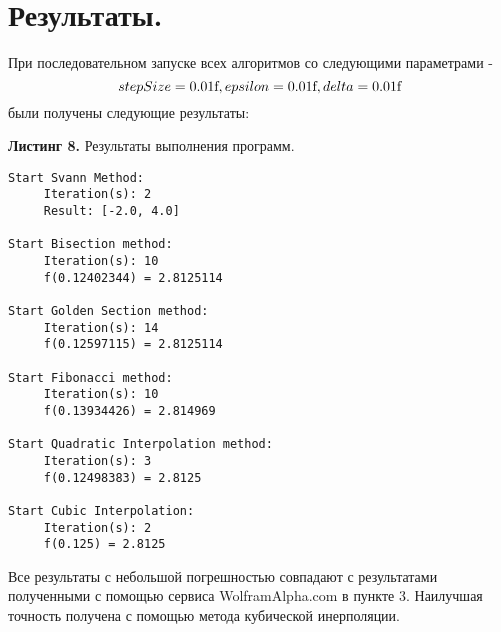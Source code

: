 \documentclass[a4paper, 12pt]{article}   	%
\begin{document}
\newpage

\section{Результаты.}
    При последовательном запуске всех алгоритмов со следующими параметрами -
    \begin{equation}
        stepSize = 0.01{\text f}, epsilon = 0.01{\text f}, delta = 0.01{\text f}
    \end{equation}
    были получены следующие результаты:
    
    \textbf{Листинг 8.} Результаты выполнения программ.
    \begin{verbatim}
Start Svann Method:
	 Iteration(s): 2
	 Result: [-2.0, 4.0]

Start Bisection method:
	 Iteration(s): 10
	 f(0.12402344) = 2.8125114

Start Golden Section method:
	 Iteration(s): 14
	 f(0.12597115) = 2.8125114

Start Fibonacci method:
	 Iteration(s): 10
	 f(0.13934426) = 2.814969

Start Quadratic Interpolation method:
	 Iteration(s): 3
	 f(0.12498383) = 2.8125

Start Cubic Interpolation:
	 Iteration(s): 2
	 f(0.125) = 2.8125
	 \end{verbatim}
 
Все результаты с небольшой погрешностью совпадают с результатами полученными с помощью сервиса WolframAlpha.com в пункте 3. Наилучшая точность получена с помощью метода кубической инерполяции.
\end{document}
